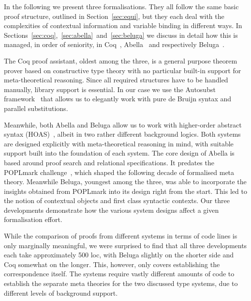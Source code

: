 \documentclass[a4paper,UKenglish]{lipics-v2016}
\theoremstyle{plain}
\begin{document}
In the following we present three formalisations.
They all follow the same basic proof structure, outlined in Section~\ref{sec:equi}, but they each deal with the complexities of contextual information and variable binding in different ways.
In Sections~\ref{sec:coq},~\ref{sec:abella}~and~\ref{sec:beluga} we discuss in detail how this is managed, in order of seniority, in Coq~\cite{CoqWebsite}, Abella~\cite{AbellaTutorial} and respectively Beluga~\cite{Pientka:CADE15}.

The Coq proof assistant, oldest among the three, is a general purpose theorem prover based on constructive type theory with no particular built-in support for meta-theoretical reasoning.
Since all required structures have to be handled manually, library support is essential.
In our case we use the Autosubst framework~\cite{DBLP:conf/itp/SchaferTS15} that allows us to elegantly work with pure de Bruijn syntax and parallel substitutions.

Meanwhile, both Abella and Beluga allow us to work with higher-order abstract syntax (HOAS)~\cite{DBLP:conf/pldi/PfenningE88}, albeit in two rather different background logics.
Both systems are designed explicitly with meta-theoretical reasoning in mind, with suitable support built into the foundation of each system.
The core design of Abella is based around proof search and relational specifications.
It predates the POPLmark challenge~\cite{poplmark}, which shaped the following decade of formalised meta theory.
Meanwhile Beluga, youngest among the three, was able to incorporate the insights obtained from POPLmark into its design right from the start.
This led to the notion of contextual objects and first class syntactic contexts.
Our three developments demonstrate how the various system designs affect a given formalisation effort.

While the comparison of proofs from different systems in terms of code lines is only marginally meaningful, we were surprised to find that all three developments each take approximately 500 loc, with Beluga slightly on the shorter side and Coq somewhat on the longer.
This, however, only covers establishing the correspondence itself.
The systems require vastly different amounts of code to establish the separate meta theories for the two discussed type systems, due to different levels of background support.
\end{document}
